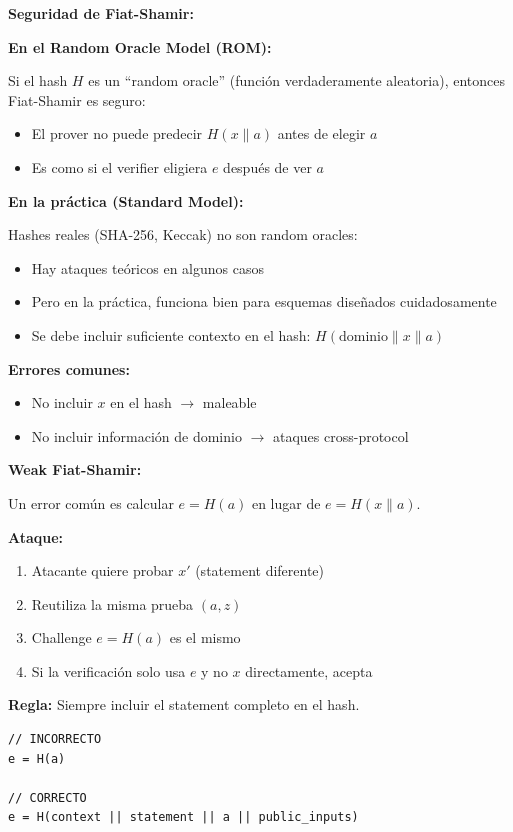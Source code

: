 \documentclass[11pt,a4paper,twoside,openright]{book}
\theoremstyle{definition}
\theoremstyle{plain}
\theoremstyle{remark}
\begin{document}
\begin{mathnote}
\textbf{Seguridad de Fiat-Shamir:}

\textbf{En el Random Oracle Model (ROM):}

Si el hash $H$ es un ``random oracle'' (función verdaderamente aleatoria), entonces Fiat-Shamir es seguro:
\begin{itemize}
    \item El prover no puede predecir $H(x \| a)$ antes de elegir $a$
    \item Es como si el verifier eligiera $e$ después de ver $a$
\end{itemize}

\textbf{En la práctica (Standard Model):}

Hashes reales (SHA-256, Keccak) no son random oracles:
\begin{itemize}
    \item Hay ataques teóricos en algunos casos
    \item Pero en la práctica, funciona bien para esquemas diseñados cuidadosamente
    \item Se debe incluir suficiente contexto en el hash: $H(\text{dominio} \| x \| a)$
\end{itemize}

\textbf{Errores comunes:}
\begin{itemize}
    \item No incluir $x$ en el hash $\to$ maleable
    \item No incluir información de dominio $\to$ ataques cross-protocol
\end{itemize}
\end{mathnote}

\begin{advertencia}
\textbf{Weak Fiat-Shamir:}

Un error común es calcular $e = H(a)$ en lugar de $e = H(x \| a)$.

\textbf{Ataque:}
\begin{enumerate}
    \item Atacante quiere probar $x'$ (statement diferente)
    \item Reutiliza la misma prueba $(a, z)$
    \item Challenge $e = H(a)$ es el mismo
    \item Si la verificación solo usa $e$ y no $x$ directamente, acepta
\end{enumerate}

\textbf{Regla:} Siempre incluir el statement completo en el hash.

\begin{verbatim}
// INCORRECTO
e = H(a)

// CORRECTO
e = H(context || statement || a || public_inputs)
\end{verbatim}
\end{advertencia}
\end{document}
